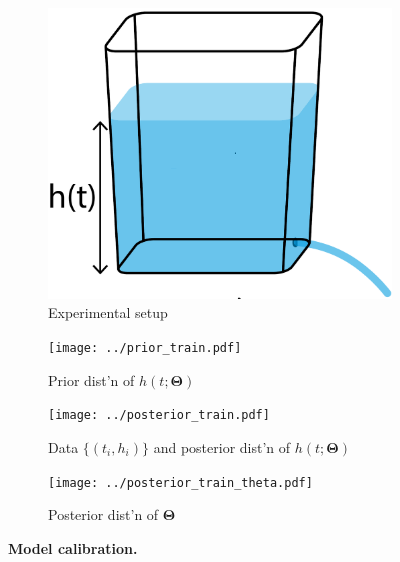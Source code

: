 \documentclass[openacc]{rsproca_new}%
\begin{document}
\begin{figure}[h!]
    \centering
        \begin{subfigure}[b]{0.3\textwidth}
    	\includegraphics[width=\textwidth]{../tank_geometry/naked_tank.pdf}
	\caption{Experimental setup} \label{fig:naked_tank}
    \end{subfigure}
    
     \begin{subfigure}[b]{0.49\textwidth}
    	\texttt{[image: ../prior\_train.pdf]}
	\caption{Prior dist'n of $h(t; \boldsymbol \Theta)$} \label{fig:prior_train}
    \end{subfigure}
     \begin{subfigure}[b]{0.49\textwidth}
    	\texttt{[image: ../posterior\_train.pdf]}
	\caption{Data $\{(t_i, h_i)\}$ and posterior dist'n of $h(t; \boldsymbol \Theta)$} \label{fig:posterior_train}
    \end{subfigure}
    
     \begin{subfigure}[b]{0.85\textwidth}
    	\texttt{[image: ../posterior\_train\_theta.pdf]}
	\caption{Posterior dist'n of $\boldsymbol \Theta$} \label{fig:posterior_train_theta}
    \end{subfigure}
    
    \caption{
      \textbf{Model calibration.}
      }
\end{figure}
\end{document}
